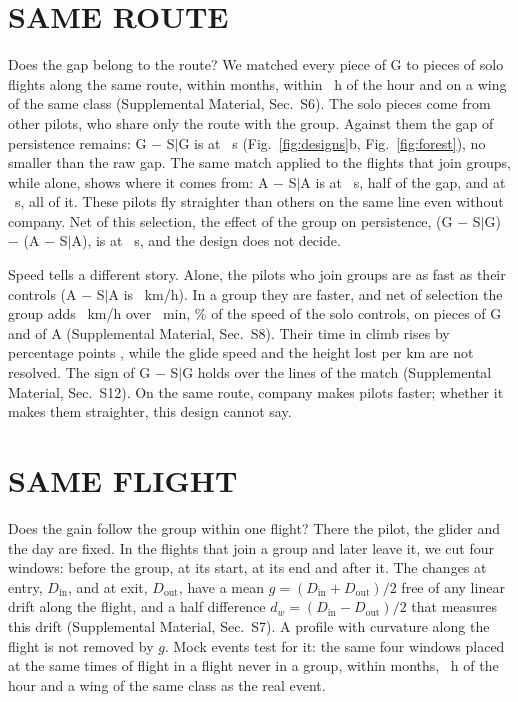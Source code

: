 \documentclass[aps,prl,twocolumn,superscriptaddress,nofootinbib]{revtex4-2}
\newcommand{\SM}[1]{Supplemental Material, Sec.~S#1}
\begin{document}
\section*{SAME ROUTE}

Does the gap belong to the route? We matched every piece of G to pieces of solo flights along the
same route, within \MatMonth{} months, within \MatHour~h of the hour and on a wing of the same
class (\SM{6}). The solo pieces come from other pilots, who share only the route with the group.
Against them the gap of persistence remains: G $-$ S$|$G is \LtRouteAlphaKGSTwo{} at \LtLagOne~s
(Fig.~\ref{fig:designs}b, Fig.~\ref{fig:forest}), no smaller than the raw gap. The same match
applied to the flights that join groups, while alone, shows where it comes from: A $-$ S$|$A is
\LtRouteAlphaKASTwo{} \LtRouteAlphaKASTwoBand{} at \LtLagOne~s, half of the gap, and
\LtRouteAlphaQASTwo{} \LtRouteAlphaQASTwoBand{} at \LtLagTwo~s, all of it. These pilots fly
straighter than others on the same line even without company. Net of this selection, the effect
of the group on persistence, (G $-$ S$|$G) $-$ (A $-$ S$|$A), is \LtRouteAlphaKDiffTwo{}
\LtRouteAlphaKDiffTwoBand{} at \LtLagOne~s, and the design does not decide.

Speed tells a different story. Alone, the pilots who join groups are as fast as their controls (A
$-$ S$|$A is \LtRouteXcAS{} \LtRouteXcASBand~km/h). In a group they are faster, and net of
selection the group adds \LtRouteXcDiff{} \LtRouteXcDiffBand~km/h over \LtXcMin~min,
\LtRouteXcDiffPct\% of the speed of the solo controls, on \LtRouteXcPiecesG{} pieces of G and
\LtRouteXcPiecesA{} of A (\SM{8}). Their time in climb rises by
\MatDeltaClimbD{} percentage points \MatDeltaClimbDBand, while the glide speed and the height lost
per km are not resolved. The sign of G $-$ S$|$G holds over the \LtRobLines{} lines of the match
(\SM{12}). On the same route, company makes pilots faster; whether it makes them straighter, this
design cannot say.

\section*{SAME FLIGHT}

Does the gain follow the group within one flight? There the pilot, the glider and the day are
fixed. In the flights that join a group and later leave it, we cut four windows: before the
group, at its start, at its end and after it. The changes at entry, $D_\mathrm{in}$, and at exit,
$D_\mathrm{out}$, have a mean $g = (D_\mathrm{in} + D_\mathrm{out})/2$ free of any linear drift
along the flight, and a half difference $d_w = (D_\mathrm{in} - D_\mathrm{out})/2$ that measures
this drift (\SM{7}). A profile with curvature along the flight is not removed by $g$. Mock events
test for it: the same four windows placed at the same times of flight in a flight never in a
group, within \MatMonth{} months, \MatHour~h of the hour and a wing of the same class as the real
event.
\end{document}
